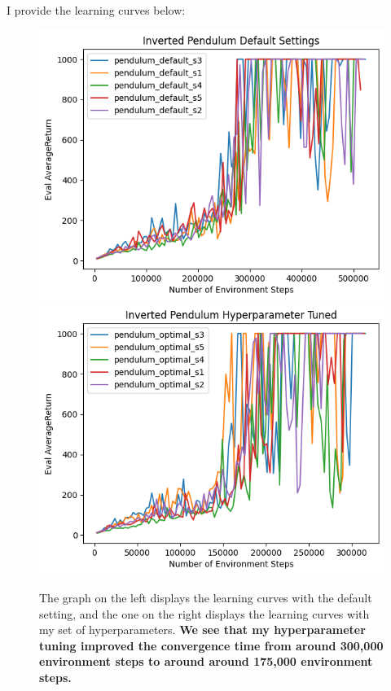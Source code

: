 \documentclass{article}
\begin{document}
\begin{sol}
    I provide the learning curves below:
    \begin{figure}[h!]
        \begin{center}
        \includegraphics[width=\textwidth/9*4]{q6_ip_default.png}
        \hspace*{1cm}
        \includegraphics[width=\textwidth/9*4]{q6_ip_optimal.png}
        \end{center}
        \caption{\color{darkblue} The graph on the left displays the learning curves with the default setting, and the one on the right displays the learning curves with my set of hyperparameters. \textbf{We see that my hyperparameter tuning improved the convergence time from around 300,000 environment steps to around around 175,000 environment steps.}}
    \end{figure}


\end{sol}
\end{document}
